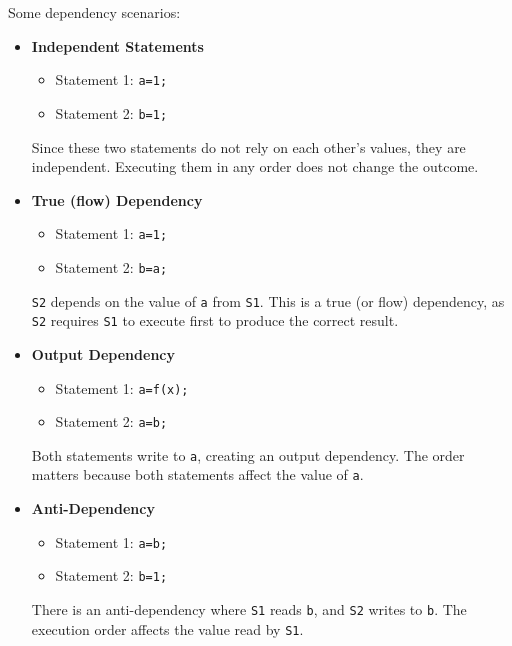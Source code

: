 \highspace
\begin{examplebox}[: Dependencies]
    Some dependency scenarios:
    \begin{itemize}
        \item \textbf{Independent Statements}
        \begin{itemize}
            \item Statement 1: \texttt{a=1;}
            \item Statement 2: \texttt{b=1;}
        \end{itemize}
        Since these two statements do not rely on each other's values, they are independent. Executing them in any order does not change the outcome.

        \newpage

        \item \textbf{True (flow) Dependency}
        \begin{itemize}
            \item Statement 1: \texttt{a=1;}
            \item Statement 2: \texttt{b=a;}
        \end{itemize}
        \texttt{S2} depends on the value of \texttt{a} from \texttt{S1}. This is a true (or flow) dependency, as \texttt{S2} requires \texttt{S1} to execute first to produce the correct result.

        \item \textbf{Output Dependency}
        \begin{itemize}
            \item Statement 1: \texttt{a=f(x);}
            \item Statement 2: \texttt{a=b;}
        \end{itemize}
        Both statements write to \texttt{a}, creating an output dependency. The order matters because both statements affect the value of \texttt{a}.
        
        \item \textbf{Anti-Dependency}
        \begin{itemize}
            \item Statement 1: \texttt{a=b;}
            \item Statement 2: \texttt{b=1;}
        \end{itemize}
        There is an anti-dependency where \texttt{S1} reads \texttt{b}, and \texttt{S2} writes to \texttt{b}. The execution order affects the value read by \texttt{S1}.
    \end{itemize}
\end{examplebox}